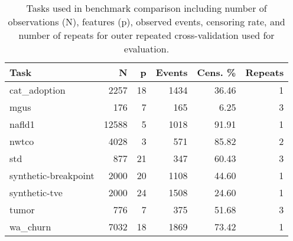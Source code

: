 \begin{table}

\caption{Tasks used in benchmark comparison including number of observations (N), features (p), observed events, censoring rate, and number of repeats for outer repeated cross-validation used for evaluation.\label{tab:bm-tasks}}
\centering
\begin{tabular}[t]{lrrrrr}
\toprule
Task & N & p & Events & Cens. \% & Repeats\\
\midrule
cat\_adoption & 2257 & 18 & 1434 & 36.46 & 1\\
mgus & 176 & 7 & 165 & 6.25 & 3\\
nafld1 & 12588 & 5 & 1018 & 91.91 & 1\\
nwtco & 4028 & 3 & 571 & 85.82 & 2\\
std & 877 & 21 & 347 & 60.43 & 3\\
synthetic-breakpoint & 2000 & 20 & 1108 & 44.60 & 1\\
synthetic-tve & 2000 & 24 & 1508 & 24.60 & 1\\
tumor & 776 & 7 & 375 & 51.68 & 3\\
wa\_churn & 7032 & 18 & 1869 & 73.42 & 1\\
\bottomrule
\end{tabular}
\end{table}
